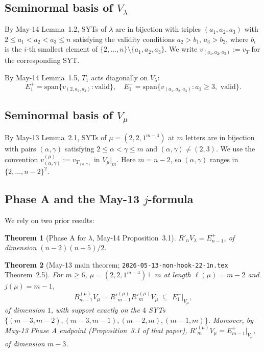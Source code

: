 \documentclass[11pt]{article}
\newtheorem{theorem}{Theorem}
\theoremstyle{definition}
\begin{document}
\subsection{Seminormal basis of $V_\lambda$}

By May-14 Lemma~1.2, SYTs of $\lambda$ are in bijection with triples
$(a_1,a_2,a_3)$ with $2\le a_1<a_2<a_3\le n$ satisfying the validity
conditions $a_2>b_1$, $a_3>b_2$, where $b_i$ is the $i$-th smallest
element of $\{2,\ldots,n\}\setminus\{a_1,a_2,a_3\}$.  We write
$v_{(a_1,a_2,a_3)}:=v_T$ for the corresponding SYT.

By May-14 Lemma~1.5, $T_1$ acts diagonally on $V_\lambda$:
\[
   E_1^+=\mathrm{span}\{v_{(2,a_2,a_3)}:\text{valid}\},
   \quad
   E_1^-=\mathrm{span}\{v_{(a_1,a_2,a_3)}:a_1\ge 3,\text{ valid}\}.
\]

\subsection{Seminormal basis of $V_\mu$}

By May-13 Lemma~2.1, SYTs of $\mu=(2,2,1^{m-4})$ at $m$ letters are
in bijection with pairs $(\alpha,\gamma)$ satisfying $2\le\alpha<\gamma\le m$
and $(\alpha,\gamma)\ne(2,3)$.  We use the convention
$v_{(\alpha,\gamma)}^{(\mu)}:=v_{T_{(\alpha,\gamma)}}$ in
$V_\mu|_m$.  Here $m=n-2$, so $(\alpha,\gamma)$ ranges in
$\{2,\ldots,n-2\}^2$.

\subsection{Phase A and the May-13 $j$-formula}

We rely on two prior results:

\begin{theorem}[Phase A for $\lambda$, May-14 Proposition~3.1]\label{thm:phaseA}
$R'_n V_\lambda=E_{n-1}^+$, of dimension $(n-2)(n-5)/2$.
\end{theorem}

\begin{theorem}[May-13 main theorem; \texttt{2026-05-13-non-hook-22-1n.tex}
Theorem~2.5]\label{thm:may13}
For $m\ge 6$, $\mu=(2,2,1^{m-4})\vdash m$ at length $\ell(\mu)=m-2$
and $j(\mu)=m-1$,
\[
   B_{m-1}^{(\mu)} V_\mu
   = R'^{(\mu)}_{m-1}R'^{(\mu)}_m V_\mu
   \;\subseteq\; E_1^-|_{V_\mu},
\]
of dimension $1$, with support exactly on the $4$ SYTs
$\{(m{-}3,m{-}2),(m{-}3,m{-}1),(m{-}2,m),(m{-}1,m)\}$.
Moreover, by May-13 Phase A endpoint (Proposition~3.1 of that
paper), $R'^{(\mu)}_m V_\mu=E_{m-1}^+|_{V_\mu}$, of dimension $m-3$.
\end{theorem}
\end{document}
